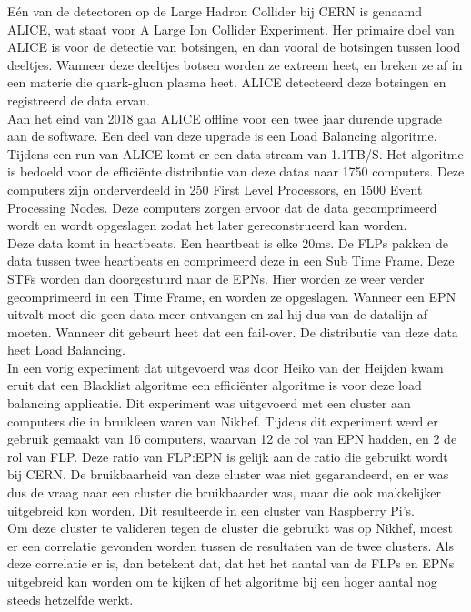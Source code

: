 Eén van de detectoren op de Large Hadron Collider bij CERN is genaamd ALICE, wat staat voor A Large Ion Collider Experiment. Her primaire doel van ALICE is voor de detectie van botsingen, en dan vooral de botsingen tussen lood deeltjes. Wanneer deze deeltjes botsen worden ze extreem heet, en breken ze af in een materie die quark-gluon plasma heet. ALICE detecteerd deze botsingen en registreerd de data ervan.\\
Aan het eind van 2018 gaa ALICE offline voor een twee jaar durende upgrade aan de software. Een deel van deze upgrade is een Load Balancing algoritme. Tijdens een run van ALICE komt er een data stream van 1.1TB/S. Het algoritme is bedoeld voor de efficiënte distributie van deze datas naar 1750 computers. Deze computers zijn onderverdeeld in 250 First Level Processors, en 1500 Event Processing Nodes. Deze computers zorgen ervoor dat de data gecomprimeerd wordt en wordt opgeslagen zodat het later gereconstrueerd kan worden.\\
Deze data komt in heartbeats. Een heartbeat is elke 20ms. De FLPs pakken de data tussen twee heartbeats en comprimeerd deze in een Sub Time Frame. Deze STFs worden dan doorgestuurd naar de EPNs. Hier worden ze weer verder gecomprimeerd in een Time Frame, en worden ze opgeslagen. Wanneer een EPN uitvalt moet die geen data meer ontvangen en zal hij dus van de datalijn af moeten. Wanneer dit gebeurt heet dat een fail-over. De distributie van deze data heet Load Balancing.\\
In een vorig experiment dat uitgevoerd was door Heiko van der Heijden kwam eruit dat een Blacklist algoritme een efficiënter algoritme is voor deze load balancing applicatie. Dit experiment was uitgevoerd met een cluster aan computers die in bruikleen waren van Nikhef. Tijdens dit experiment werd er gebruik gemaakt van 16 computers, waarvan 12 de rol van EPN hadden, en 2 de rol van FLP. Deze ratio van FLP:EPN is gelijk aan de ratio die gebruikt wordt bij CERN. De bruikbaarheid van deze cluster was niet gegarandeerd, en er was dus de vraag naar een cluster die bruikbaarder was, maar die ook makkelijker uitgebreid kon worden. Dit resulteerde in een cluster van Raspberry Pi's.\\
Om deze cluster te valideren tegen de cluster die gebruikt was op Nikhef, moest er een correlatie gevonden worden tussen de resultaten van de twee clusters. Als deze correlatie er is, dan betekent dat, dat het het aantal van de FLPs en EPNs uitgebreid kan worden om te kijken of het algoritme bij een hoger aantal nog steeds hetzelfde werkt.\\
